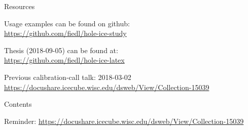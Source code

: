 
\begin{frame}{Resources}
  \begin{center}
    Usage examples can be found on github: \\ \vspace{0.2cm}
    \url{https://github.com/fiedl/hole-ice-study}

    \vspace{1cm}

    Thesis (2018-09-05) can be found at: \\ \vspace{0.2cm}
    \url{https://github.com/fiedl/hole-ice-latex}

    \vspace{1cm}

    Previous calibration-call talk: 2018-03-02 \\ \vspace{0.2cm}
    \url{https://docushare.icecube.wisc.edu/dsweb/View/Collection-15039}
  \end{center}
\end{frame}

\begin{frame}{Contents}

  \tableofcontents[subsectionstyle=show]

  Reminder: \url{https://docushare.icecube.wisc.edu/dsweb/View/Collection-15039}

\end{frame}

